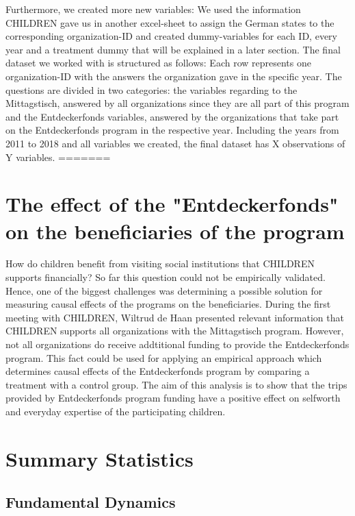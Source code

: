 \documentclass[12pt, a4paper, titlepage]{article}\usepackage[]{graphicx}\usepackage[]{color}
\begin{document}
Furthermore, we created more new variables: We used the information CHILDREN gave us in another excel-sheet to assign the German states to the corresponding organization-ID and created dummy-variables for each ID, every year and a treatment dummy that will be explained in a later section. 
The final dataset we worked with is structured as follows: Each row represents one organization-ID with the answers the organization gave in the specific year. The questions are divided in two categories: the variables regarding to the Mittagstisch, answered by all organizations since they are all part of this program and the Entdeckerfonds variables, answered by the organizations that take part on the Entdeckerfonds program in the respective year. Including the years from 2011 to 2018 and all variables we created, the final dataset has X observations of Y variables.
=======


\section{The effect of the "Entdeckerfonds" on the beneficiaries of the program}

How do children benefit from visiting social institutions that CHILDREN supports financially? So far this question could not be empirically validated. Hence, one of the biggest challenges was determining a possible solution for measuring causal effects of the programs on the beneficiaries. During the first meeting with CHILDREN, Wiltrud de Haan presented relevant information that CHILDREN supports all organizations with the Mittagstisch program. However, not all organizations do receive addtitional funding to provide the Entdeckerfonds program. This fact could be used for applying an empirical approach which determines causal effects of the Entdeckerfonds program by comparing a treatment with a control group. The aim of this analysis is to show that the trips provided by Entdeckerfonds program funding have a positive effect on selfworth and everyday expertise of the participating children. 



\section{Summary Statistics}
\subsection{Fundamental Dynamics} 
\end{document}
